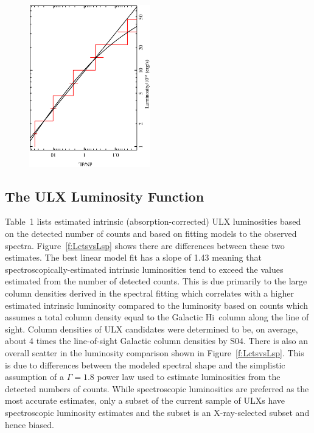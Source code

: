 \documentclass{article}
\newcommand{\hi}{H{\sc i}}
\begin{document}
\begin{center}
\begin{figure}[t]
\includegraphics[angle=-90,width=0.47\textwidth]{f06d.eps} %
\end{figure}
\end{center}

\subsection{The ULX Luminosity Function} \label{s:xlf}

Table~1 lists estimated intrinsic (absorption-corrected)
 ULX luminosities based on the detected number of counts and based on 
 fitting models to the observed spectra.
Figure~\ref{f:LctsvsLsp} shows there are differences between these two 
 estimates. The best linear model fit has a slope of 1.43 meaning that 
 spectroscopically-estimated intrinsic luminosities tend to exceed 
 the values estimated from the number of detected counts.
This is due primarily to the large column densities 
 derived in the spectral fitting which correlates with a higher estimated intrinsic luminosity
 compared to the luminosity based on counts which assumes a total column density 
 equal to the Galactic \hi\ column along the line of sight.
Column densities of ULX candidates were determined to be, on average, about 4 times the 
 line-of-sight Galactic column densities by S04.
There is also an overall scatter in the luminosity comparison shown in Figure~\ref{f:LctsvsLsp}.
This is due to differences between the modeled spectral shape and the simplistic assumption 
 of a $\Gamma=1.8$ power law used to estimate luminosities from the detected numbers of counts.
While spectroscopic luminosities are preferred as the most accurate estimates,
 only a subset of the current sample of ULXs have spectroscopic luminosity estimates
 and the subset is an X-ray-selected subset and hence biased.
\end{document}
